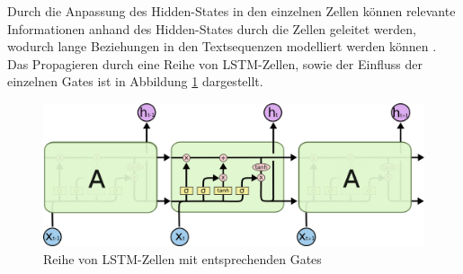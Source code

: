 Durch die Anpassung des Hidden-States in den einzelnen Zellen können relevante Informationen anhand des Hidden-States durch die Zellen geleitet werden, wodurch lange Beziehungen in den Textsequenzen modelliert werden können \citep{lstmexplained}.
Das Propagieren durch eine Reihe von LSTM-Zellen, sowie der Einfluss der einzelnen Gates ist in Abbildung \ref{lstm_chain} dargestellt.


\begin{figure}[h]
    \label{lstm_chain}
    \centering
    \includegraphics[width=\textwidth]{bilder/LSTM3-chain}
    \caption{Reihe von LSTM-Zellen mit entsprechenden Gates \citep{lstmexplained}}
\end{figure}

\pagebreak
